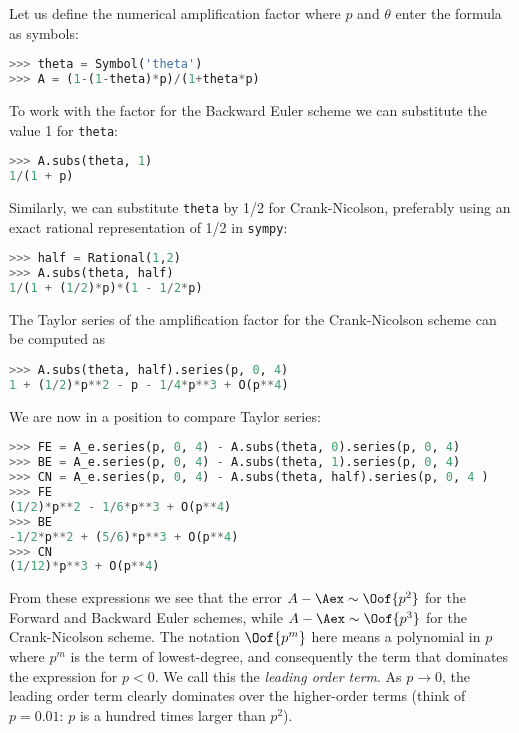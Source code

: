 \documentclass[graybox,sectrefs,envcountresetchap,open=right,final]{svmonodo}
\begin{document}
Let us define the numerical amplification factor where $p$ and $\theta$
enter the formula as symbols:

\begin{lstlisting}[language=Python,style=blue1_bluegreen]
>>> theta = Symbol('theta')
>>> A = (1-(1-theta)*p)/(1+theta*p)
\end{lstlisting}
To work with the factor for the Backward Euler scheme we
can substitute the value 1 for \texttt{theta}:

\begin{lstlisting}[language=Python,style=blue1_bluegreen]
>>> A.subs(theta, 1)
1/(1 + p)
\end{lstlisting}
Similarly, we can substitute \texttt{theta} by 1/2 for Crank-Nicolson,
preferably using an exact rational representation of 1/2 in \texttt{sympy}:

\begin{lstlisting}[language=Python,style=blue1_bluegreen]
>>> half = Rational(1,2)
>>> A.subs(theta, half)
1/(1 + (1/2)*p)*(1 - 1/2*p)
\end{lstlisting}

The Taylor series of the amplification factor for the Crank-Nicolson
scheme can be computed as

\begin{lstlisting}[language=Python,style=blue1_bluegreen]
>>> A.subs(theta, half).series(p, 0, 4)
1 + (1/2)*p**2 - p - 1/4*p**3 + O(p**4)
\end{lstlisting}
We are now in a position to compare Taylor series:

\begin{lstlisting}[language=Python,style=blue1_bluegreen]
>>> FE = A_e.series(p, 0, 4) - A.subs(theta, 0).series(p, 0, 4)
>>> BE = A_e.series(p, 0, 4) - A.subs(theta, 1).series(p, 0, 4)
>>> CN = A_e.series(p, 0, 4) - A.subs(theta, half).series(p, 0, 4 )
>>> FE
(1/2)*p**2 - 1/6*p**3 + O(p**4)
>>> BE
-1/2*p**2 + (5/6)*p**3 + O(p**4)
>>> CN
(1/12)*p**3 + O(p**4)
\end{lstlisting}
From these expressions we see that the error $A-\Aex\sim \Oof{p^2}$
for the Forward and Backward Euler schemes, while
$A-\Aex\sim \Oof{p^3}$ for the Crank-Nicolson scheme.
The notation $\Oof{p^m}$ here means a polynomial in $p$ where
$p^m$ is the term of lowest-degree, and consequently the term that
dominates the expression for $p < 0$. We call this the
\emph{leading order term}. As $p\rightarrow 0$, the leading order term
clearly dominates over the higher-order terms (think of $p=0.01$:
$p$ is a hundred times larger than $p^2$).
\end{document}

